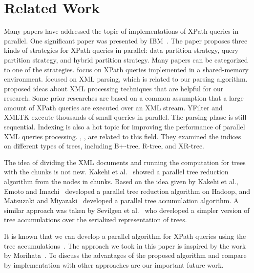 \section{Related Work}

Many papers have addressed the topic of implementations of XPath queries 
in parallel. One significant paper was presented by IBM~\cite{BLKK09}. The paper 
proposes three kinds of strategies for XPath queries in 
parallel: data partition strategy, query partition strategy, 
and hybrid partition strategy. Many papers can be categorized to one of the strategies. \cite{KrYa10,ZhPC10,HSYW14} focus on XPath queries 
implemented in a shared-memory environment. \cite{PLZC07,WZYL08}
focused on XML parsing, which is related to our parsing 
algorithm. \cite{AnAH10} proposed ideas about XML processing 
techniques that are helpful for our research. 
Some prior researches are based on a common assumption 
that a large amount of XPath queries are executed over an XML stream.
YFilter\cite{DiFF11} and XMLTK \cite{AvGT02} execute thousands of small queries in parallel. The parsing phase is still sequential.
Indexing is also a hot topic for improving the performance of parallel XML queries processing.
\cite{CVZT02}, \cite{Grus02}, \cite{JLCW02} are related to this field. 
They examined the indices on different types of trees, including B+-tree, R-tree, and XR-tree. 

The idea of dividing the XML documents and running the computation for trees
with the chunks is not new.   Kakehi et al.~\cite{KaME07} showed a parallel tree reduction algorithm
from the nodes in chunks.  Based on the idea given by Kakehi et al., Emoto and Imachi~\cite{EmIm12} developed 
a parallel tree reduction algorithm on Hadoop, and Matsuzaki and Miyazaki~\cite{MaMi15} developed 
a parallel tree accumulation algorithm. A similar approach was taken by Sevilgen et al.~\cite{SeAF05} who developed a simpler version of tree accumulations over the serialized representation of trees.

It is known that we can develop a parallel algorithm for XPath queries using the tree accumulations~\cite{Mats07}.
The approach we took in this paper is inspired by the work by Morihata~\cite{Mori13}.
To discuss the advantages of the proposed algorithm and compare by implementation with other approaches
are our important future work.
